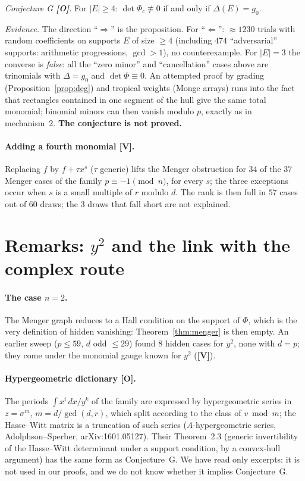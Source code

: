 \documentclass[11pt,a4paper]{article}
\begin{document}
\begin{center}\emph{Conjecture G \textbf{[O]}.} For $|E|\ge4$: $\det\Phi_c\not\equiv0$
if and only if $\Delta(E)=g_0$.\end{center}

\emph{Evidence.} The direction ``$\Rightarrow$'' is the proposition. For
``$\Leftarrow$'': $\approx1230$ trials with random coefficients on supports $E$ of
size $\ge4$ (including $474$ ``adversarial'' supports: arithmetic progressions,
$\gcd>1$), no counterexample. For $|E|=3$ the converse is \emph{false}: all the
``zero minor'' and ``cancellation'' cases above are trinomials with
$\Delta=g_0$ and $\det\Phi\equiv0$. An attempted proof by grading
(Proposition~\ref{prop:deg}) and tropical weights (Monge arrays) runs into the
fact that rectangles contained in one segment of the hull give the same total
monomial; binomial minors can then vanish modulo $p$, exactly as in
mechanism~2. \textbf{The conjecture is not proved.}

\paragraph{Adding a fourth monomial \textbf{[V]}.} Replacing $f$ by $f+\tau x^s$
($\tau$ generic) lifts the Menger obstruction for $34$ of the $37$ Menger cases
of the family $p\equiv-1\pmod n$, for every $s$; the three exceptions occur when
$s$ is a small multiple of $r$ modulo $d$. The rank is then full in $57$ cases
out of $60$ draws; the $3$ draws that fall short are not explained.

\section{Remarks: $y^2$ and the link with the complex route}
\label{sec:remarks}

\paragraph{The case $n=2$.} The Menger graph reduces to a Hall condition on the
support of $\Phi$, which is the very definition of hidden vanishing:
Theorem~\ref{thm:menger} is then empty. An earlier sweep ($p\le59$, $d$ odd
$\le29$) found $8$ hidden cases for $y^2$, none with $d=p$; they come under the
monomial gauge known for $y^2$ (\textbf{[V]}).

\paragraph{Hypergeometric dictionary \textbf{[O]}.} The periods
$\int x^i\,dx/y^k$ of the family are expressed by hypergeometric series in
$z=\sigma^m$, $m=d/\gcd(d,r)$, which split according to the class of
$v\bmod m$; the Hasse--Witt matrix is a truncation of such series
($A$-hypergeometric series, Adolphson--Sperber, arXiv:1601.05127). Their
Theorem~2.3 (generic invertibility of the Hasse--Witt determinant under a support
condition, by a convex-hull argument) has the same form as Conjecture~G. We have
read only excerpts: it is not used in our proofs, and we do not know whether it
implies Conjecture~G.
\end{document}
